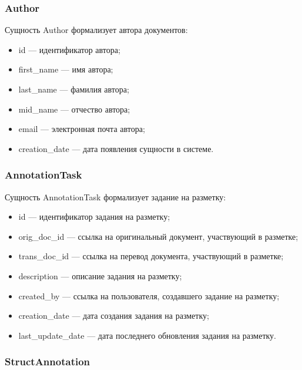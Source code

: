 \subsubsection*{Author}

Сущность Author формализует автора документов:
\begin{itemize}
    \item id --- идентификатор автора;
    \item first\_name --- имя автора;
    \item last\_name --- фамилия автора;
    \item mid\_name --- отчество автора;
    \item email --- электронная почта автора;
    \item creation\_date --- дата появления сущности в системе.
\end{itemize}

\subsubsection*{AnnotationTask}

Сущность AnnotationTask формализует задание на разметку:
\begin{itemize}
    \item id --- идентификатор задания на разметку;
    \item orig\_doc\_id --- ссылка на оригинальный документ, участвующий в разметке;
    \item trans\_doc\_id --- ссылка на перевод документа, участвующий в разметке;
    \item description --- описание задания на разметку;
    \item created\_by --- ссылка на пользователя, создавшего задание на разметку;
    \item creation\_date --- дата создания задания на разметку;
    \item last\_update\_date --- дата последнего обновления задания на разметку.
\end{itemize}

\subsubsection*{StructAnnotation}

